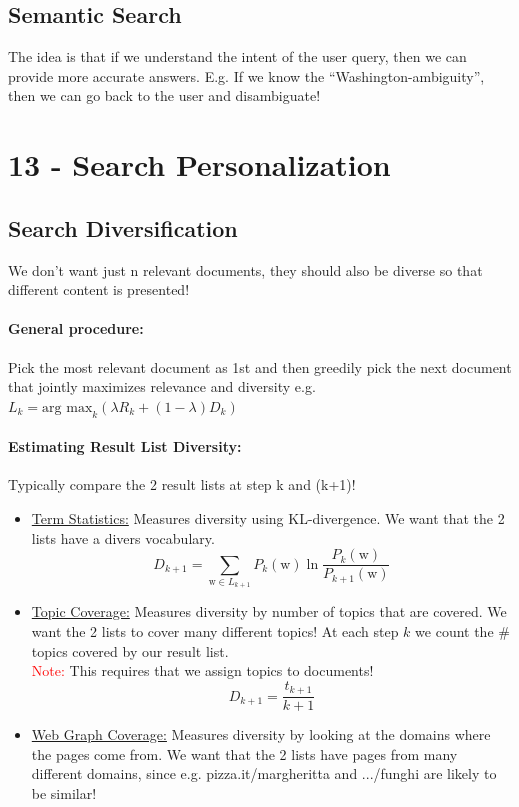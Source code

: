\documentclass[a4paper,11pt]{article}
\newcommand{\msection}[1]{\section{#1}\vspace{-0.5mm}}
\newcommand{\w}{\text{w}}
\begin{document}
\begin{multicols}{2}
\subsection{Semantic Search}
The idea is that if we understand the intent of the user query, then we can provide more accurate answers. E.g. If we know the ``Washington-ambiguity'', then we can go back to the user and disambiguate!
\vfill
\columnbreak

\msection{13 - Search Personalization}
\subsection{Search Diversification}
We don't want just n relevant documents, they should also be diverse so that different content is presented!\\
\paragraph{General procedure:} Pick the most relevant document as 1st and then greedily pick the next document that jointly maximizes relevance and diversity e.g. $L_k = \text{arg max}_k (\lambda R_k + (1 - \lambda) D_k)$\\

\paragraph{Estimating Result List Diversity:} Typically compare the 2 result lists at step k and (k+1)!
  \begin{itemize}
    \item \underline{Term Statistics:} Measures diversity using KL-divergence. We want that the 2 lists have a divers vocabulary.
    \[
      D_{k+1} = \sum_{\w \in L_{k+1}} P_k(\w) \ln \frac{P_k(\w)}{P_{k+1}(\w)}
    \]
    \item \underline{Topic Coverage:} Measures diversity by number of topics that are covered. We want the 2 lists to cover many different topics! At each step $k$ we count the \# topics covered by our result list. \\
    \textcolor{red}{Note:} This requires that we assign topics to documents!
    \[
      D_{k+1} = \frac{t_{k+1}}{k+1}
    \]
    \item \underline{Web Graph Coverage:} Measures diversity by looking at the domains where the pages come from. We want that the 2 lists have pages from many different domains, since e.g. pizza.it/margheritta and .../funghi are likely to be similar!
  \end{itemize}


\end{multicols}
\end{document}
